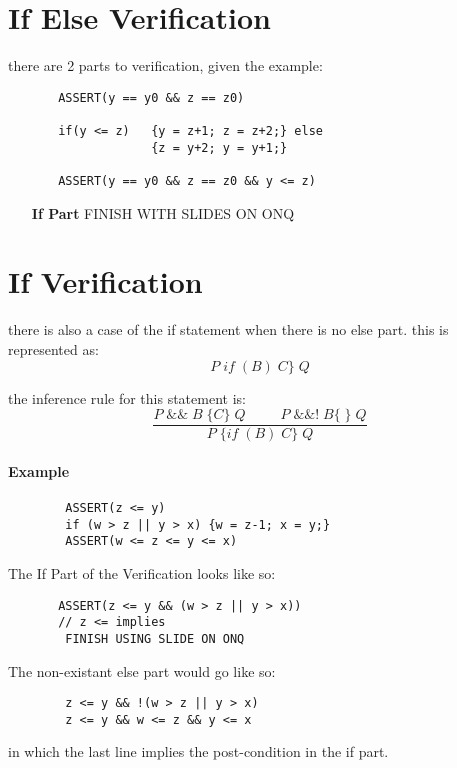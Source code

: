 \documentclass[12pt]{book}
\title{\coursetitle\linebreak\lecturename}
\author{\\Cain Susko\\ 
           \\ \\ \\
      Queen's University 
    \\School of Computing\\}
\begin{document}
\begin{titlepage}
        \maketitle
\end{titlepage}


\section*{If Else Verification}
there are 2 parts to verification, given the example:
\begin{verbatim}
       ASSERT(y == y0 && z == z0)

       if(y <= z)   {y = z+1; z = z+2;} else
                    {z = y+2; y = y+1;}

       ASSERT(y == y0 && z == z0 && y <= z)
\end{verbatim}
\begin{enumerate}
        \item[\textbf{If Part}] FINISH WITH SLIDES ON ONQ
\end{enumerate}

\section*{If Verification}
there is also a case of the if statement when there is no else part. this is represented as:
\[P\;if\;(B)\;C\}\;Q\]

the inference rule for this statement is:
\[\frac{P\;\&\&\;B\;\{C\}\;Q\;\;\;\;\;\;\;\;\;P\;\&\&!\;B\{\;\}\;Q}{P\;\{if\;(B)\;C\}\;Q}\]

\paragraph{Example}
\begin{verbatim}
        ASSERT(z <= y)
        if (w > z || y > x) {w = z-1; x = y;}
        ASSERT(w <= z <= y <= x)
\end{verbatim}

The If Part of the Verification looks like so:
\begin{verbatim}
       ASSERT(z <= y && (w > z || y > x)) 
       // z <= implies 
        FINISH USING SLIDE ON ONQ
\end{verbatim}

The non-existant else part would go like so:
\begin{verbatim}
        z <= y && !(w > z || y > x)
        z <= y && w <= z && y <= x
\end{verbatim}
in which the last line implies the post-condition in the if part.
\end{document}
